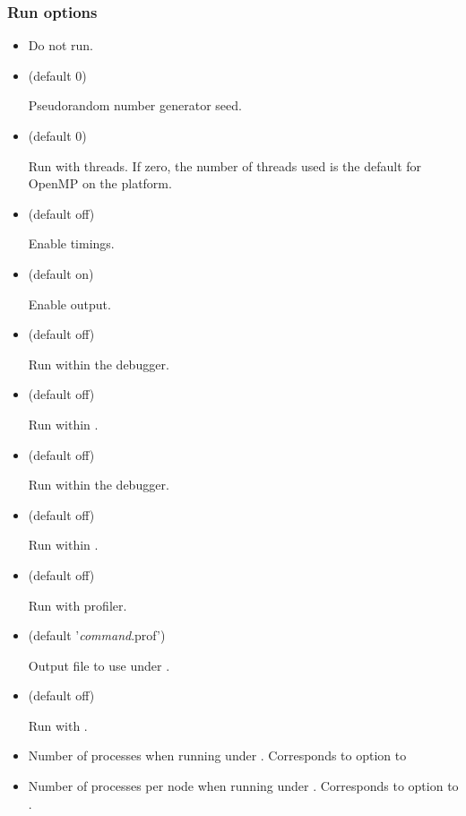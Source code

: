 \subsubsection{Run options}

\begin{itemize}
\item {}

Do not run.

\item {} (default 0)

Pseudorandom number generator seed.

\item {} (default 0)

Run with  threads. If zero, the number of threads used is the
default for OpenMP on the platform.

\item {} (default off)

Enable timings.

\item {} (default on)

Enable output.

\item {} (default off)

Run within the  debugger.

\item {} (default off)

Run within .

\item {} (default off)

Run within the  debugger.

\item {} (default off)

Run within .

\item {} (default off)

Run with  profiler.

\item {} (default '\textsl{command}.prof')

Output file to use under .

\item {} (default off)

Run with .

\item {}

Number of processes when running under . Corresponds to 
option to 

\item {}

Number of processes per node when running under . Corresponds to
 option to .

\end{itemize}

